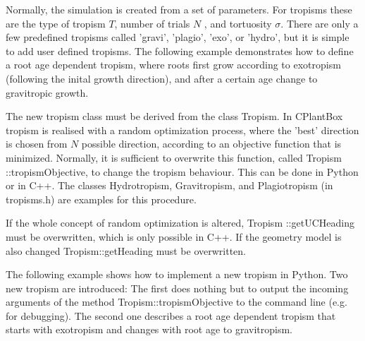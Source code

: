 
Normally, the simulation is created from a set of parameters. For tropisms these are the type of tropism $T$, number of trials $N$ , and tortuosity $\sigma$. There are only a few predefined tropisms called 'gravi', 'plagio', 'exo', or 'hydro', but it is simple to add user defined tropisms.
The following example demonstrates how to define a root age dependent tropism, where roots first grow according to exotropism (following the inital growth direction), and after a certain age change to gravitropic growth.

The new tropism class must be derived from the class Tropism. In CPlantBox tropism is realised with a random optimization process, where the 'best' direction is chosen from $N$ possible direction, according to an objective function that is minimized. Normally, it is sufficient to overwrite this function, called Tropism ::tropismObjective, to change the tropism behaviour. This can be done in Python or in C++. The classes Hydrotropism, Gravitropism, and Plagiotropism (in tropisms.h) are examples for this procedure.

If the whole concept of random optimization is altered, Tropism ::getUCHeading must be overwritten, which is only possible in C++. If the geometry model is also changed Tropism::getHeading must be overwritten.

The following example shows how to implement a new tropism in Python. Two new tropism are introduced:
The first does nothing but to output the incoming arguments of the method Tropism::tropismObjective to the command line (e.g. for debugging). The second one describes a root age dependent tropism that starts with exotropism and changes with root age to gravitropism.



